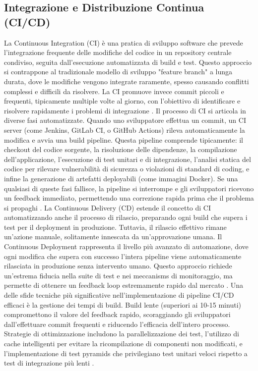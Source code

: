 \documentclass[12pt,a4paper,openright,twoside]{book}
\begin{document}
\subsection{Integrazione e Distribuzione Continua (CI/CD)}
La Continuous Integration (CI) è una pratica di sviluppo software che prevede l'integrazione frequente delle modifiche del codice in un repository centrale condiviso, seguita dall'esecuzione automatizzata di build e test. Questo approccio si contrappone al tradizionale modello di sviluppo "feature branch" a lunga durata, dove le modifiche vengono integrate raramente, spesso causando conflitti complessi e difficili da risolvere. La CI promuove invece commit piccoli e frequenti, tipicamente multiple volte al giorno, con l'obiettivo di identificare e risolvere rapidamente i problemi di integrazione \cite{Rahman_2018}.
Il processo di CI si articola in diverse fasi automatizzate. Quando uno sviluppatore effettua un commit, un CI server (come Jenkins, GitLab CI, o GitHub Actions) rileva automaticamente la modifica e avvia una build pipeline. Questa pipeline comprende tipicamente: il checkout del codice sorgente, la risoluzione delle dipendenze, la compilazione dell'applicazione, l'esecuzione di test unitari e di integrazione, l'analisi statica del codice per rilevare vulnerabilità di sicurezza o violazioni di standard di coding, e infine la generazione di artefatti deployabili (come immagini Docker). Se una qualsiasi di queste fasi fallisce, la pipeline si interrompe e gli sviluppatori ricevono un feedback immediato, permettendo una correzione rapida prima che il problema si propaghi \cite{ghaleb2019empirical}.
La Continuous Delivery (CD) estende il concetto di CI automatizzando anche il processo di rilascio, preparando ogni build che supera i test per il deployment in produzione. Tuttavia, il rilascio effettivo rimane un'azione manuale, solitamente innescata da un'approvazione umana. Il Continuous Deployment rappresenta il livello più avanzato di automazione, dove ogni modifica che supera con successo l'intera pipeline viene automaticamente rilasciata in produzione senza intervento umano. Questo approccio richiede un'estrema fiducia nella suite di test e nei meccanisms di monitoraggio, ma permette di ottenere un feedback loop estremamente rapido dal mercato \cite{teixeira2020systematic}.
Una delle sfide tecniche più significative nell'implementazione di pipeline CI/CD efficaci è la gestione dei tempi di build. Build lente (superiori ai 10-15 minuti) compromettono il valore del feedback rapido, scoraggiando gli sviluppatori dall'effettuare commit frequenti e riducendo l'efficacia dell'intero processo. Strategie di ottimizzazione includono la parallelizzazione dei test, l'utilizzo di cache intelligenti per evitare la ricompilazione di componenti non modificati, e l'implementazione di test pyramids che privilegiano test unitari veloci rispetto a test di integrazione più lenti \cite{ghaleb2019empirical}.
\end{document}
